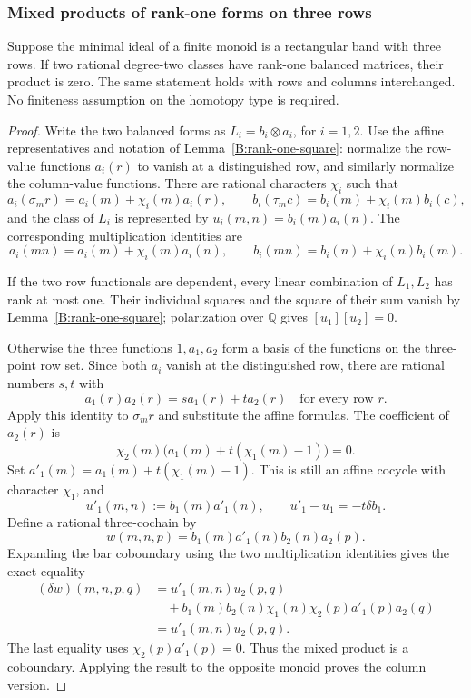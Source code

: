 \subsubsection{Mixed products of rank-one forms on three rows}

\begin{lemma}\label{B:three-row-rank-one-products}
Suppose the minimal ideal of a finite monoid is a rectangular
band with three rows.  If two rational degree-two classes have
rank-one balanced matrices, their product is zero.  The same
statement holds with rows and columns interchanged.  No finiteness
assumption on the homotopy type is required.
\end{lemma}
\begin{proof}
Write the two balanced forms as $L_i=b_i\otimes a_i$, for $i=1,2$.
Use the affine representatives and notation of
Lemma~\ref{B:rank-one-square}: normalize the row-value functions
$a_i(r)$ to vanish at a distinguished row, and similarly normalize
the column-value functions.  There are rational characters $\chi_i$
such that
\[
 a_i(\sigma_m r)=a_i(m)+\chi_i(m)a_i(r),\qquad
 b_i(\tau_m c)=b_i(m)+\chi_i(m)b_i(c),
\]
and the class of $L_i$ is represented by
$u_i(m,n)=b_i(m)a_i(n)$.  The corresponding multiplication identities
are
\[
 a_i(mn)=a_i(m)+\chi_i(m)a_i(n),\qquad
 b_i(mn)=b_i(n)+\chi_i(n)b_i(m).
\]

If the two row functionals are dependent, every linear combination
of $L_1,L_2$ has rank at most one.  Their individual squares and
the square of their sum vanish by Lemma~\ref{B:rank-one-square};
polarization over $\mathbb Q$ gives $[u_1][u_2]=0$.

Otherwise the three functions $1,a_1,a_2$ form a basis of the
functions on the three-point row set.  Since both $a_i$ vanish at
the distinguished row, there are rational numbers $s,t$ with
\[
 a_1(r)a_2(r)=s a_1(r)+t a_2(r)
 \quad\text{for every row }r.
\]
Apply this identity to $\sigma_m r$ and substitute the affine
formulas.  The coefficient of $a_2(r)$ is
\[
 \chi_2(m)\bigl(a_1(m)+t(\chi_1(m)-1)\bigr)=0.
\]
Set $a'_1(m)=a_1(m)+t(\chi_1(m)-1)$.  This is still an affine
cocycle with character $\chi_1$, and
\[
 u'_1(m,n):=b_1(m)a'_1(n),\qquad
 u'_1-u_1=-t\delta b_1.
\]
Define a rational three-cochain by
\[
 w(m,n,p)=b_1(m)a'_1(n)b_2(n)a_2(p).
\]
Expanding the bar coboundary using the two multiplication
identities gives the exact equality
\begin{align*}
 (\delta w)(m,n,p,q)
 &=u'_1(m,n)u_2(p,q)\\
 &\quad+b_1(m)b_2(n)\chi_1(n)
              \chi_2(p)a'_1(p)a_2(q)\\
 &=u'_1(m,n)u_2(p,q).
\end{align*}
The last equality uses $\chi_2(p)a'_1(p)=0$.  Thus the mixed
product is a coboundary.  Applying the result to the opposite
monoid proves the column version.
\end{proof}

